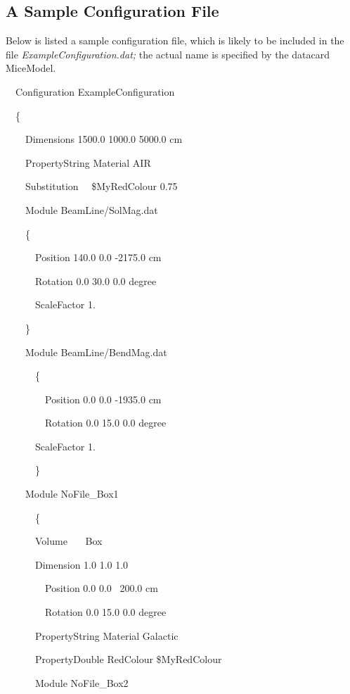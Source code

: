 \subsection{A Sample Configuration File}
Below is listed a sample configuration file, which is likely to be included in the file
\textit{ExampleConfiguration.dat;} the actual name is specified by the datacard MiceModel.

{\ttfamily
\ \ Configuration ExampleConfiguration}

{\ttfamily
\ \ \{}

{\ttfamily
\ \ \ \ Dimensions 1500.0 1000.0 5000.0 cm}

{\ttfamily
\ \ \ \ PropertyString Material AIR}

{\ttfamily
\ \ \ \ Substitution \ \ \$MyRedColour 0.75}

{\ttfamily
\ \ \ \ Module BeamLine/SolMag.dat}

{\ttfamily
\ \ \ \ \{}

{\ttfamily
\ \ \ \ \ \ Position 140.0 0.0 -2175.0 cm}

{\ttfamily
\ \ \ \ \ \ Rotation 0.0 30.0 0.0 degree}

{\ttfamily
\ \ \ \ \ \ ScaleFactor 1.}

{\ttfamily
\ \ \ \ \}}

{\ttfamily
\ \ \ \ Module BeamLine/BendMag.dat}

{\ttfamily
\ \ \ \ \ \ \{}

{\ttfamily
\ \ \ \ \ \ \ \ Position 0.0 0.0 -1935.0 cm}

{\ttfamily
\ \ \ \ \ \ \ \ Rotation 0.0 15.0 0.0 degree}

{\ttfamily
\ \ \ \ \ \ ScaleFactor 1.}

{\ttfamily
\ \ \ \ \ \ \}}

{\ttfamily
\ \ \ \ Module NoFile\_Box1}

{\ttfamily
\ \ \ \ \ \ \{}

{\ttfamily
\ \ \ \ \ \ Volume \ \ \ Box}

{\ttfamily
\ \ \ \ \ \ Dimension 1.0 1.0 1.0}

{\ttfamily
\ \ \ \ \ \ \ \ Position 0.0 0.0 \ 200.0 cm}

{\ttfamily
\ \ \ \ \ \ \ \ Rotation 0.0 15.0 0.0 degree}

{\ttfamily
\ \ \ \ \ \ PropertyString Material Galactic}

{\ttfamily
\ \ \ \ \ \ PropertyDouble RedColour \$MyRedColour}

{\ttfamily
\ \ \ \ \ \ Module NoFile\_Box2}

